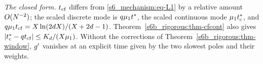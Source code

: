 \emph{The closed form.} $t_{\mathrm{cf}}$ differs from \eqref{s6_mechanism:eq-L1} by a relative amount $O(N^{-2})$; the scaled
discrete mode is $q\mu_{1}t^{*}$, the scaled continuous mode $\mu_{1}t^{*}_{\mathrm{c}}$, and $q\mu_{1}t_{\mathrm{cf}}=X\ln(2d X)/(X+2d-1)$.
Theorem~\ref{s6b_rigorous:thm-cfcont} also gives $|t^{*}_{\mathrm{c}}-qt_{\mathrm{cf}}|\le K_{d}/(X\mu_{1})$. Without the corrections of
Theorem~\ref{s6b_rigorous:thm-window}, $g'$ vanishes at an explicit time given by the two slowest poles and their
weights.
